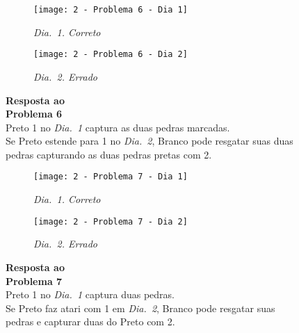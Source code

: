 \begin{SCfigure}[][h!]
    \begin{subfigure}[t]{.31\textwidth}
        \texttt{[image: 2 - Problema 6 - Dia 1]}
        \caption*{\emph{Dia.\@~1. Correto}}
    \end{subfigure}
    \hfill
    \begin{subfigure}[t]{.31\textwidth}
        \texttt{[image: 2 - Problema 6 - Dia 2]}
        \caption*{\emph{Dia.\@~2. Errado}}
    \end{subfigure}
    \hfill
    \caption*{\textbf{Resposta ao\\Problema 6}\\\vspace*{.25cm}Preto 1 no \emph{Dia.\@~1} captura as duas pedras marcadas.\\\vspace*{.25cm}Se Preto estende para 1 no \emph{Dia.\@~2}, Branco pode resgatar suas duas pedras capturando as duas pedras pretas com 2.}
\end{SCfigure}

\pagebreak

\begin{SCfigure}[][h!]
    \begin{subfigure}[t]{.31\textwidth}
        \texttt{[image: 2 - Problema 7 - Dia 1]}
        \caption*{\emph{Dia.\@~1. Correto}}
    \end{subfigure}
    \hfill
    \begin{subfigure}[t]{.31\textwidth}
        \texttt{[image: 2 - Problema 7 - Dia 2]}
        \caption*{\emph{Dia.\@~2. Errado}}
    \end{subfigure}
    \hfill
    \caption*{\textbf{Resposta ao\\Problema 7}\\\vspace*{.25cm}Preto 1 no \emph{Dia.\@~1} captura duas pedras.\\\vspace*{.25cm}Se Preto faz atari com 1 em \emph{Dia.\@~2}, Branco pode resgatar suas pedras e capturar duas do Preto com 2.}
\end{SCfigure}

\vfill

